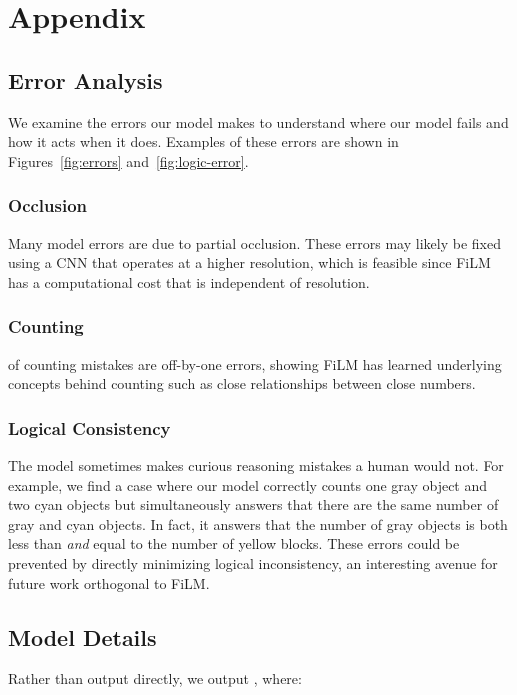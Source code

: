 \documentclass[letterpaper]{article} \usepackage{aaai18}  \usepackage{times}  \usepackage{helvet}  \usepackage{courier}  \usepackage{url}  \usepackage{graphicx}  \frenchspacing  \setlength{\pdfpagewidth}{8.5in}  \setlength{\pdfpageheight}{11in}
\begin{document}
\section{Appendix}
  
	\subsection{Error Analysis} \label{errors}

        We examine the errors our model makes to understand where our model fails and how it acts when it does. Examples of these errors are shown in Figures~\ref{fig:errors} and~\ref{fig:logic-error}.
        
        \subsubsection{Occlusion}
        Many model errors are due to partial occlusion. These errors may likely be fixed using a CNN that operates at a higher resolution, which is feasible since FiLM has a computational cost that is independent of resolution.
        
        \subsubsection{Counting}
		 of counting mistakes are off-by-one errors, showing FiLM has learned underlying concepts behind counting such as close relationships between close numbers.

		\subsubsection{Logical Consistency}
    	The model sometimes makes curious reasoning mistakes a human would not. For example, we find a case where our model correctly counts one gray object and two cyan objects but simultaneously answers that there are the same number of gray and cyan objects. In fact, it answers that the number of gray objects is both less than \textit{and} equal to the number of yellow blocks. These errors could be prevented by directly minimizing logical inconsistency, an interesting avenue for future work orthogonal to FiLM.
    
    \subsection{Model Details}
    Rather than output  directly, we output , where:
\end{document}
